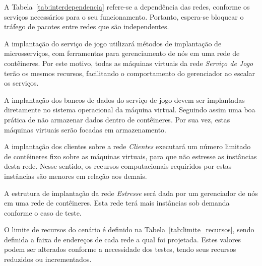 A Tabela~\ref{tab:interdependencia} refere-se a dependência das redes, conforme os serviços necessários para o seu funcionamento.
%
Portanto, espera-se bloquear o tráfego de pacotes entre redes que são independentes.

A implantação do serviço de jogo utilizará métodos de implantação de microsserviços, com ferramentas para gerenciamento de nós em uma rede de contêineres.
%
Por este motivo, todas as máquinas virtuais da rede \textit{Serviço de Jogo} terão os mesmos recursos, facilitando o comportamento do gerenciador ao escalar os serviços.

A implantação dos bancos de dados do serviço de jogo devem ser implantadas diretamente no sistema operacional da máquina virtual.
%
Seguindo assim uma boa prática de não armazenar dados dentro de contêineres.
%
Por sua vez, estas máquinas virtuais serão focadas em armazenamento.

A implantação dos clientes sobre a rede \textit{Clientes} executará um número limitado de contêineres fixo sobre as máquinas virtuais, para que não estresse as instâncias desta rede.
%
Nesse sentido, os recursos computacionais requiridos por estas instâncias são menores em relação aos demais.

A estrutura de implantação da rede \textit{Estresse} será dada por um gerenciador de nós em uma rede de contêineres.
%
Esta rede terá mais instâncias sob demanda conforme o caso de teste.

O limite de recursos do cenário é definido na Tabela~\ref{tab:limite_recursos}, sendo definida a faixa de endereços de cada rede a qual foi projetada.
%
Estes valores podem ser alterados conforme a necessidade dos testes, tendo seus recursos reduzidos ou incrementados.

